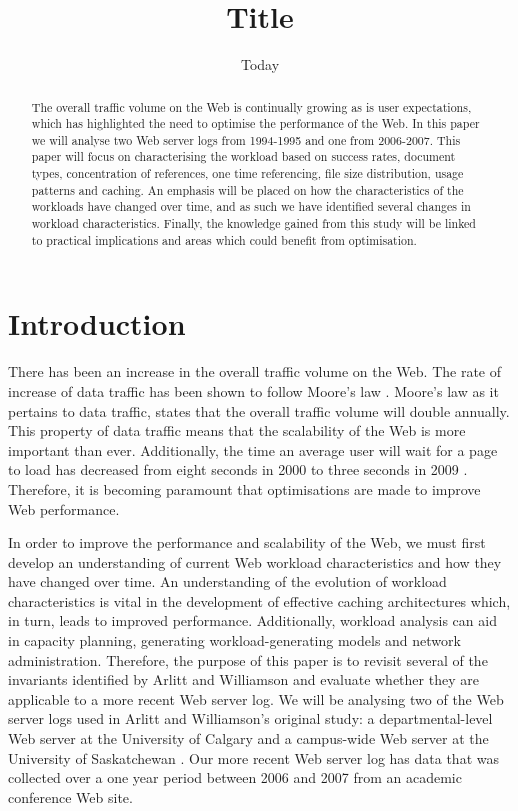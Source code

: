 \documentclass[10pt,conference]{IEEEtran}
\title{Title}
\author{\IEEEauthorblockN{Chelsea Farley, Ryan Lewis, David Armstrong, Rina Gao and Ryunosuke Madenokoji}
\IEEEauthorblockA{The University of Auckland}}
\date{Today}
\begin{document}
\maketitle

\begin{abstract}
The overall traffic volume on the Web is continually growing as is user expectations, which has highlighted the need to optimise the performance of the Web. In this paper we will analyse two Web server logs from 1994-1995 and one from 2006-2007. This paper will focus on characterising the workload based on success rates, document types, concentration of references, one time referencing, file size distribution, usage patterns and caching. An emphasis will be placed on how the characteristics of the workloads have changed over time, and as such we have identified several changes in workload characteristics. Finally, the knowledge gained from this study will be linked to practical implications and areas which could benefit from optimisation.
\end{abstract}

\section{Introduction}
There has been an increase in the overall traffic volume on the Web. The rate of increase of data traffic has been shown to follow Moore's law \cite{williams05}. Moore's law as it pertains to data traffic, states that the overall traffic volume will double annually. This property of data traffic means that the scalability of the Web is more important than ever. Additionally, the time an average user will wait for a page to load has decreased from eight seconds in 2000 to three seconds in 2009 \cite{Butkiewicz}. Therefore, it is becoming paramount that optimisations are made to improve Web performance.

In order to improve the performance and scalability of the Web, we must first develop an understanding of current Web workload characteristics and how they have changed over time. An understanding of the evolution of workload characteristics is vital in the development of effective caching architectures which, in turn, leads to improved performance. Additionally, workload analysis can aid in capacity planning, generating workload-generating models and network administration. Therefore, the purpose of this paper is to revisit several of the invariants identified by Arlitt and Williamson \cite{keynote} and evaluate whether they are applicable to a more recent Web server log. We will be analysing two of the Web server logs used in Arlitt and Williamson's original study: a departmental-level Web server at the University of Calgary and a campus-wide Web server at the University of Saskatchewan \cite{keynote}. Our more recent Web server log has data that was collected over a one year period between 2006 and 2007 from an academic conference Web site.
\end{document}
